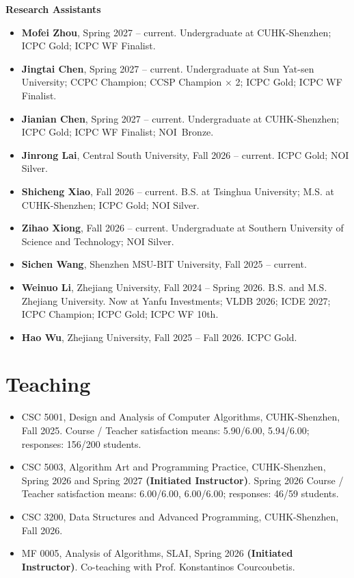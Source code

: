 \documentclass[10pt]{article}
\begin{document}
\textbf{Research Assistants}
\begin{itemize}
  \item \textbf{Mofei Zhou}, Spring 2027 -- current. Undergraduate at CUHK-Shenzhen; ICPC Gold; ICPC WF Finalist.
  \item \textbf{Jingtai Chen}, Spring 2027 -- current. Undergraduate at Sun Yat-sen University; CCPC Champion; CCSP Champion $\times$ 2; ICPC Gold; ICPC WF Finalist.
  \item \textbf{Jianian Chen}, Spring 2027 -- current. Undergraduate at CUHK-Shenzhen; ICPC Gold; ICPC WF Finalist; NOI~Bronze.
  \item \textbf{Jinrong Lai}, Central South University, Fall 2026 -- current. ICPC Gold; NOI Silver.
  \item \textbf{Shicheng Xiao}, Fall 2026 -- current. B.S. at Tsinghua University; M.S. at CUHK-Shenzhen; ICPC Gold; NOI Silver.
  \item \textbf{Zihao Xiong}, Fall 2026 -- current. Undergraduate at Southern University of Science and Technology; NOI Silver.
  \item \textbf{Sichen Wang}, Shenzhen MSU-BIT University, Fall 2025 -- current.
  \item \textbf{Weinuo Li}, Zhejiang University, Fall 2024 -- Spring 2026. B.S. and M.S. Zhejiang University. Now at Yanfu Investments; VLDB 2026; ICDE 2027; ICPC Champion; ICPC Gold; ICPC WF 10th.
  \item \textbf{Hao Wu}, Zhejiang University, Fall 2025 -- Fall 2026. ICPC Gold.
\end{itemize}

\section*{Teaching}
\begin{itemize}
  \item CSC 5001, Design and Analysis of Computer Algorithms, CUHK-Shenzhen, Fall 2025. \textcolor{blue!65!black}{Course / Teacher satisfaction means: 5.90/6.00, 5.94/6.00; responses: 156/200 students.}
  \item CSC 5003, Algorithm Art and Programming Practice, CUHK-Shenzhen, Spring 2026 and Spring 2027 \textbf{(Initiated Instructor)}. \textcolor{blue!65!black}{Spring 2026 Course / Teacher satisfaction means: 6.00/6.00, 6.00/6.00; responses: 46/59 students.}
  \item CSC 3200, Data Structures and Advanced Programming, CUHK-Shenzhen, Fall 2026.
  \item MF 0005, Analysis of Algorithms, SLAI, Spring 2026 \textbf{(Initiated Instructor)}. Co-teaching with Prof. Konstantinos Courcoubetis.
\end{itemize}
\end{document}
